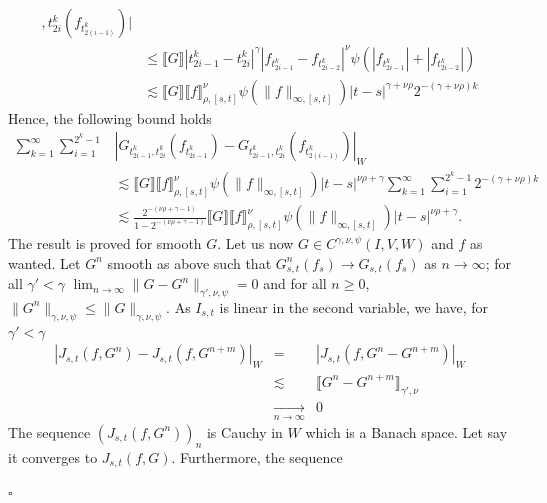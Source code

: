 \documentclass[a4paper,11pt]{article}
\newenvironment{proof}{{\sc Proof.}}{\hfill$\square$}
\begin{document}
\begin{proof}
\begin{equation*}
\begin{split}
{    ,t_{2i}^{k}} (f_{t_{2(i-1)}^{k}} ) |  \\ & \leqslant  \llbracket G
    \rrbracket | t_{2i-1}^{k} -t^{k}_{2i} |^{\gamma} | f_{t_{2i-1}^{k}}
    -f_{t_{2i-2}^{k}} |^{\nu} \psi ( | f_{t_{2i-1}^{k}} | + | f_{t_{2i-2}^{k}}
    | )\\
    & \lesssim  \llbracket G \rrbracket \llbracket f \rrbracket^{\nu}_{\rho
    , [s,t]} \psi ( \|f\|_{\infty ,[s,t]} ) |t-s|^{\gamma + \nu \rho} 2^{- (
    \gamma + \nu \rho ) k}
    \end{split}
    \end{equation*}
  Hence, the following bound holds
  \begin{equation} \begin{split}
       \sum_{k=1}^{\infty} \sum_{i=1}^{2^{k} -1} & |G_{t_{2i-1}^{k}
       ,t_{2i}^{k}} (f_{t_{2i-1}^{k}} )-G_{t_{2i-1}^{k} ,t_{2i}^{k}}
       (f_{t_{2(i-1)}^{k}} )|_{W}\\
       & \lesssim \llbracket G \rrbracket \llbracket f \rrbracket^{\nu}_{\rho
       , [s,t]} \psi ( \| f \|_{\infty ,[s,t]} )  |t-s|^{\nu \rho + \gamma} 
       \sum_{k=1}^{\infty} \sum_{i=1}^{2^{k} -1} 2^{- ( \gamma + \nu \rho )
       k}\\
       & \lesssim \frac{2^{- ( \nu \rho + \gamma -1)}}{1-2^{- ( \nu \rho +
       \gamma -1)}} \llbracket G \rrbracket \llbracket f
       \rrbracket^{\nu}_{\rho , [s,t]} \psi ( \|f\|_{\infty ,[s,t]} ) 
       |t-s|^{\nu \rho + \gamma} .
     \end{split} \end{equation}
  The result is proved for smooth $G$. Let us now $G \in C^{\gamma , \nu ,
  \psi} (I,V,W)$ and $f$ as wanted. Let $G^{n}$ smooth as above such that
  $G_{s,t}^{n} (f_{s} ) \to G_{s,t} (f_{s} )$ as $n \to \infty$; for all
  $\gamma' < \gamma$ $\lim_{n \to \infty} \|G-G^{n} \|_{\gamma' , \nu , \psi}
  =0$ and for all $n \ge 0$, $\|G^{n} \|_{\gamma , \nu , \psi} \leqslant
  \|G\|_{\gamma , \nu , \psi}$. As $I_{s,t}$ is linear in the second variable,
  we have, for $\gamma' < \gamma$
  \begin{eqnarray*}
    |J_{s,t} (f,G^{n} )-J_{s,t} (f,G^{n+m} )|_{W} & = & |J_{s,t} (f,G^{n}
    -G^{n+m} )|_{W}\\
    & \lesssim & \llbracket G^{n} -G^{n+m} \rrbracket_{\gamma' , \nu}\\
    & \underset{n \to \infty}{\to} & 0
  \end{eqnarray*}
  The sequence $( J_{s,t} (f,G^{n} ) )_{n}$ is Cauchy in $W$ which is a Banach
  space. Let say it converges to $J_{s,t} (f,G)$. Furthermore, the sequence

\end{proof}
\end{document}
